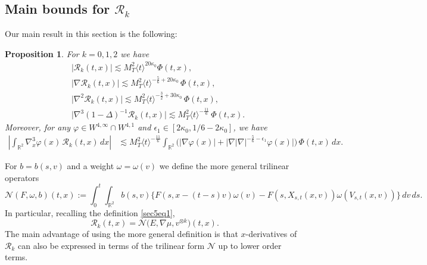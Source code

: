 \documentclass[reqno,11pt]{amsart}
\numberwithin{equation}{section}
\newtheorem{proposition}[theorem]{Proposition}
\begin{document}
	\subsection{Main bounds for $\mathcal{R}_k$} Our main result in this section is the following:
	
	\begin{proposition}\label{maines} For $k=0,1,2$ we have
		\begin{align}
			\label{q43}
			&	\big|\mathcal{R}_k(t,x)\big|
			\lesssim M_T^2\langle t\rangle^{20\kappa_0}\Phi(t,x),\\
			\label{q44}
			&	 \big|\nabla \mathcal{R}_k(t,x)\big|
			\lesssim M_T^2\langle t\rangle^{-\frac{5}{6}+20\kappa_0}\,\Phi(t,x),\\
			\label{q45}
			&	\big|\nabla^2 \mathcal{R}_k(t,x)\big|
			\lesssim M_T^2\langle t\rangle^{-\frac{3}{2}+30\kappa_0}\,\Phi(t,x),\\
			\label{q46} 
			&\big|\nabla^3(1-\Delta)^{-1}\mathcal{R}_k(t,x)\big|
			\lesssim M_T^2\langle t\rangle^{-\frac{11}{6}}\,\Phi(t,x).
		\end{align}
		Moreover, for any $\varphi\in W^{4,\infty}\cap W^{4,1}$ and $\epsilon_1\in [2\kappa_0,1/6-2\kappa_0]$, we have
		\begin{align}
			\left|\int_{\mathbb{R}^2} \nabla_x^3\varphi(x)\,\mathcal{R}_k(t,x)\,dx\right|
			&\lesssim M_T^2\langle t\rangle^{-\frac{11}{6}}\int_{\mathbb{R}^2}\Big(|\nabla \varphi(x)|
			+\big|\nabla |\nabla|^{-\frac{5}{6}-\epsilon_1}\varphi(x)\big|\Big)\,\Phi(t,x)\,dx.\label{q47}
		\end{align}
\end{proposition}
	
For $b=b(s,v)$ and a weight $\omega=\omega(v)$ we define the more general trilinear operators
	\begin{equation}\label{defN-new}
		\mathcal{N}(F,\omega,b)(t,x)
		:=
		\int_0^t\!\!\int_{\mathbb{R}^2} b(s,v)\Big\{F(s,x-(t-s)v)\omega(v)-F(s,X_{s,t}(x,v))\omega(V_{s,t}(x,v))\Big\}\,dv\,ds.
	\end{equation}
	In particular, recalling the definition \eqref{sec5eq1},
	\begin{equation}\label{sec5eq6}
	\mathcal{R}_k(t,x)=\mathcal{N}\big(E,\nabla\mu,v^{\otimes k}\big)(t,x).
	\end{equation}
	The main advantage of using the more general definition is that $x$-derivatives of $\mathcal{R}_k$ can also be expressed in terms of the trilinear form $\mathcal{N}$ up to lower order terms.
	
\end{document}
